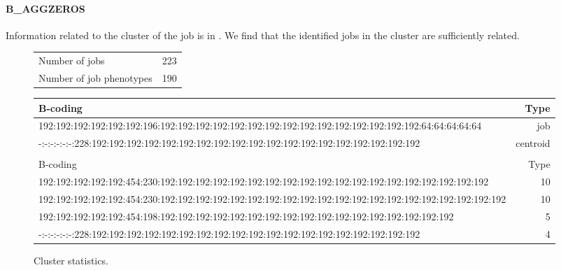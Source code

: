 \documentclass{jhps}
\begin{document}
\FloatBarrier
\paragraph{B\_AGGZEROS}
Information related to the cluster of the job is in .
We find that the identified jobs in the cluster are sufficiently related.

\begin{figure}
	\begin{subtable}{\textwidth}
		\centering
		\begin{tabular}{ll}
			Number of jobs & 223 \\
			Number of job phenotypes & 190 \\
		\end{tabular}
		\caption{Cluster statistics.}
		\label{cluster:use_case:bin_aggzeros:stats}
	\end{subtable}
	\medskip
	\begin{subtable}{\textwidth}
		\centering
		\begin{tiny}
      \begin{tabular}{l|r}
       \rowcolor{tblhead}
       B-coding                                                                                                    & Type     \\ 
       \hline
       192:192:192:192:192:192:196:192:192:192:192:192:192:192:192:192:192:192:192:192:192:192:64:64:64:64:64      & job      \\ 
       -:-:-:-:-:-:228:192:192:192:192:192:192:192:192:192:192:192:192:192:192:192:192:192:192:192                 & centroid \\ 
			 \multicolumn{2}{l}{}                                                                                      \\
       \rowcolor{tblhead}
       B-coding                                                                                                    & Type     \\ 
       \hline
       192:192:192:192:192:454:230:192:192:192:192:192:192:192:192:192:192:192:192:192:192:192:192:192:192:192     & 10       \\ 
       192:192:192:192:192:454:230:192:192:192:192:192:192:192:192:192:192:192:192:192:192:192:192:192:192:192:192 & 10       \\ 
       192:192:192:192:192:454:198:192:192:192:192:192:192:192:192:192:192:192:192:192:192:192:192:192             & 5        \\ 
       -:-:-:-:-:-:228:192:192:192:192:192:192:192:192:192:192:192:192:192:192:192:192:192:192:192                 & 4        \\ 

\end{tabular}
\end{tiny}
\end{subtable}
\end{figure}
\end{document}
